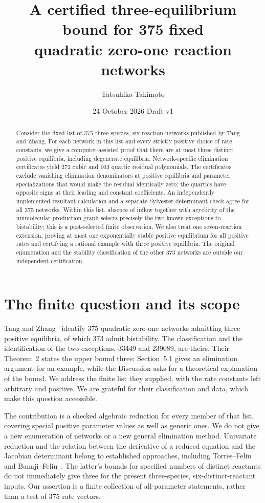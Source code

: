 \documentclass[11pt,a4paper]{article}
\title{A certified three-equilibrium bound for 375 fixed\protect\\
quadratic zero-one reaction networks}
\author{Tatsuhiko Takimoto}
\date{24 October 2026 \quad Draft v1}
\begin{document}
\maketitle
\begin{abstract}
Consider the fixed list of 375 three-species, six-reaction networks
published by Tang and Zhang. For each network in this list and every
strictly positive choice of rate constants, we give a computer-assisted
proof that there are at most three distinct positive equilibria,
including degenerate equilibria. Network-specific elimination
certificates yield 272 cubic and 103 quartic residual polynomials.
The certificates exclude vanishing elimination denominators at positive
equilibria and parameter specializations that would make the residual
identically zero;
the quartics have opposite signs at their leading and constant
coefficients. An independently implemented resultant calculation
and a separate Sylvester-determinant check agree for all 375 networks.
Within this list, absence of inflow together with acyclicity of the
unimolecular production graph selects precisely the two known
exceptions to bistability; this is a post-selected finite observation.
We also treat one seven-reaction extension, proving at most one
exponentially stable positive equilibrium for all positive rates and
certifying a rational example with three positive equilibria.
The original enumeration and the stability classification of the
other 373 networks are outside our independent certification.
\end{abstract}

\section{The finite question and its scope}
Tang and Zhang~\cite{TZ} identify 375 quadratic zero-one networks
admitting three positive equilibria, of which 373 admit bistability.
The classification and the identification of the two exceptions,
33449 and 239089, are theirs. Their Theorem~2 states the upper bound
three; Section~5.1 gives an elimination argument for an example, while
the Discussion asks for a theoretical explanation of the bound.
We address the finite list they supplied, with the rate constants
left arbitrary and positive. We are grateful for their classification
and data, which make this question accessible.

The contribution is a checked algebraic reduction for every member
of that list, covering special positive parameter values as well as
generic ones. We do not give a new enumeration of networks or a new
general elimination method. Univariate reduction and the relation
between the derivative of a reduced equation and the Jacobian
determinant belong to established approaches, including
Torres--Feliu~\cite{TF} and Banaji--Feliu~\cite{BF}.
The latter's bounds for specified numbers of distinct reactants do
not immediately give three for the present three-species,
six-distinct-reactant inputs. Our assertion is a finite collection
of all-parameter statements, rather than a test of 375 rate vectors.
\end{document}

